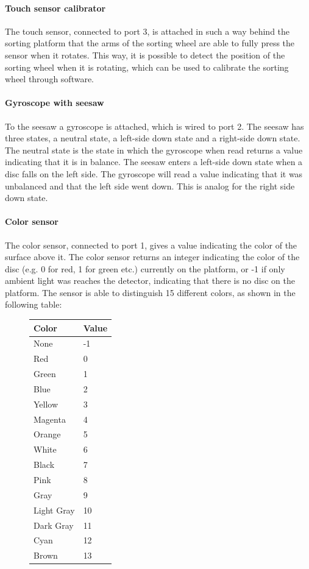 \documentclass[a4paper,oneside,11pt]{article}
\begin{document}
\paragraph{Touch sensor calibrator}
The touch sensor, connected to port 3, is attached in such a way behind the sorting platform that the arms of the sorting wheel are able to fully press the sensor when it rotates. This way, it is possible to detect the position of the sorting wheel when it is rotating, which can be used to calibrate the sorting wheel through software.

\paragraph{Gyroscope with seesaw}
To the seesaw a gyroscope is attached, which is wired to port 2. The seesaw has three states, a neutral state, a left-side down state and a right-side down state. The neutral state is the state in which the gyroscope when read returns a value indicating that it is in balance. The seesaw enters a left-side down state when a disc falls on the left side. The gyroscope will read a value indicating that it was unbalanced and that the left side went down. This is analog for the right side down state.

\paragraph{Color sensor}
The color sensor, connected to port 1, gives a value indicating the color of the surface above it. The color sensor returns an integer indicating the color of the disc (e.g. 0 for red, 1 for green etc.) currently on the platform, or -1 if only ambient light was reaches the detector, indicating that there is no disc on the platform. The sensor is able to distinguish 15 different colors, as shown in the following table:

\begin{figure}[H]
\begin{tabular}{|l|l|}
\hline
\textbf{Color} & \textbf{Value} \\
\hline
None & -1 \\
Red & 0 \\
Green & 1 \\
Blue & 2 \\
Yellow & 3 \\
Magenta & 4 \\
Orange & 5 \\
White & 6 \\
Black & 7 \\
Pink & 8 \\
Gray & 9 \\
Light Gray & 10 \\
Dark Gray & 11 \\
Cyan & 12 \\
Brown & 13 \\
\hline
\end{tabular}
\end{figure}
\end{document}
